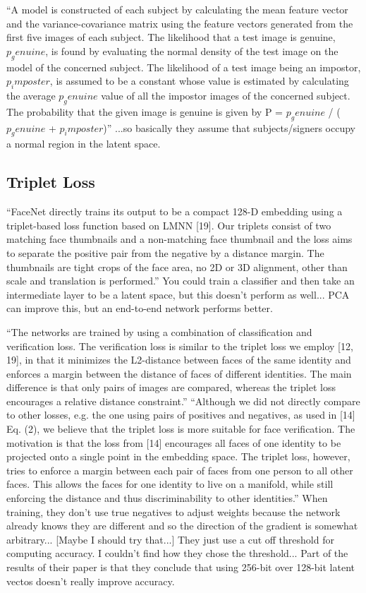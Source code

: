 ``A model is constructed of each subject by calculating the mean feature
vector and the variance-covariance matrix using the feature
vectors generated from the first five images of each subject.
The likelihood that a test image is genuine, $p_genuine$, is
found by evaluating the normal density of the test image on
the model of the concerned subject. The likelihood of a test
image being an impostor, $p_imposter$, is assumed to be a constant whose value is estimated by calculating the average $p_genuine$ value of all the impostor images of the concerned
subject. The probability that the given image is genuine is
given by P = $p_genuine$ / ($p_genuine$ + $p_imposter$)''
...so basically they assume that subjects/signers occupy a normal region in the latent space.

\subsection{Triplet Loss}
``FaceNet directly trains
its output to be a compact 128-D embedding using a triplet-based loss function based on LMNN [19]. Our triplets consist of two matching face thumbnails and a non-matching
face thumbnail and the loss aims to separate the positive pair
from the negative by a distance margin. The thumbnails are
tight crops of the face area, no 2D or 3D alignment, other
than scale and translation is performed.''
You could train a classifier and then take an intermediate layer to be a latent space, but this doesn't perform as well...
PCA can improve this, but an end-to-end network performs better.
\cite{face_net}

``The networks are trained by using a combination of classification and verification loss. The verification
loss is similar to the triplet loss we employ [12, 19], in that it
minimizes the L2-distance between faces of the same identity and enforces a margin between the distance of faces of
different identities. The main difference is that only pairs of
images are compared, whereas the triplet loss encourages a
relative distance constraint.''
``Although we did not directly compare to other losses,
e.g. the one using pairs of positives and negatives, as used
in [14] Eq. (2), we believe that the triplet loss is more suitable for face verification. The motivation is that the loss
from [14] encourages all faces of one identity to be projected onto a single point in the embedding space. The
triplet loss, however, tries to enforce a margin between each
pair of faces from one person to all other faces. This allows the faces for one identity to live on a manifold, while
still enforcing the distance and thus discriminability to other
identities.''
When training, they don't use true negatives to adjust weights because the network already knows they are different and so the direction of the gradient is somewhat arbitrary...
[Maybe I should try that...]
They just use a cut off threshold for computing accuracy.
I couldn't find how they chose the threshold...
Part of the results of their paper is that they conclude that using 256-bit over 128-bit latent vectos doesn't really improve accuracy.


